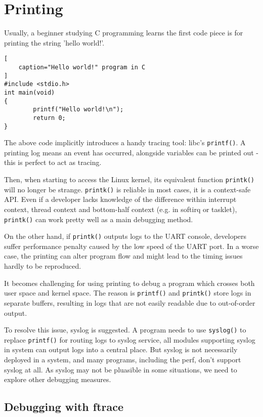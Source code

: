 \documentclass[11pt]{diazessay} %
\def\code#1{\texttt{#1}}
\begin{document}
\section*{Printing}

Usually, a beginner studying C programming learns the first code piece is for
printing the string 'hello world!'.

\begin{lstlisting}[
	caption="Hello world!" program in C
]
#include <stdio.h>
int main(void)
{
        printf("Hello world!\n");
        return 0;
}
\end{lstlisting}

The above code implicitly introduces a handy tracing tool: libc's
\code{printf()}. A printing log means an event has occurred, alongside
variables can be printed out - this is perfect to act as tracing.

Then, when starting to access the Linux kernel, its
equivalent function \code{printk()} will no longer be strange. \code{printk()}
is reliable in most cases, it is a context-safe API. Even if a developer lacks
knowledge of the difference within interrupt context, thread context and
bottom-half context (e.g. in softirq or tasklet), \code{printk()} can work
pretty well as a main debugging method.

On the other hand, if \code{printk()} outputs logs to the UART console,
developers suffer performance penalty caused by the low speed of the UART
port. In a worse case, the printing can alter program flow and might lead to
the timing issues hardly to be reproduced.

It becomes challenging for using printing to debug a program which crosses
both user space and kernel space. The reason is \code{printf()} and
\code{printk()} store logs in separate buffers, resulting in logs that are not
easily readable due to out-of-order output.

To resolve this issue, syslog is suggested. A program needs to use
\code{syslog()} to replace \code{printf()} for routing logs to syslog
service, all modules supporting syslog in system can output logs into a
central place. But syslog is not necessarily deployed in a system, and many
programs, including the perf, don't support syslog at all. As syslog may not
be pluasible in some situations, we need to explore other debugging measures.

\subsection*{Debugging with ftrace}
\end{document}
